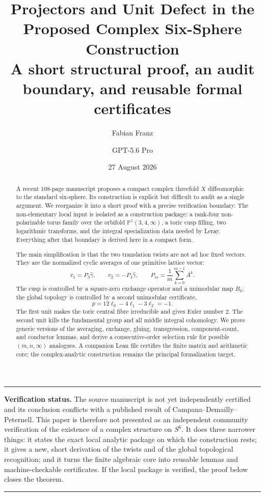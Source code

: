 \documentclass[11pt,reqno]{amsart}
\title[Projectors and unit defect for the proposed complex $S^6$]{Projectors and Unit Defect in the Proposed Complex Six-Sphere Construction\\[4pt]
\large A short structural proof, an audit boundary, and reusable formal certificates}
\author{Fabian Franz}
\author{GPT-5.6 Pro}
\date{27 August 2026}
\numberwithin{equation}{section}
\newcommand{\Pone}{\mathbb P^1}
\newcommand{\wideg}{\widehat\gamma}
\theoremstyle{definition}
\newenvironment{statusnote}{%
  \begin{center}\begin{minipage}{0.94\textwidth}\small\hrule\vspace{0.7em}%
}{%
  \vspace{0.7em}\hrule\end{minipage}\end{center}%
}
\begin{document}
\begin{abstract}
A recent 108-page manuscript proposes a compact complex threefold $X$ diffeomorphic to the standard six-sphere. Its construction is explicit but difficult to audit as a single argument. We reorganize it into a short proof with a precise verification boundary. The non-elementary local input is isolated as a construction package: a rank-four non-polarizable torus family over the orbifold $\Pone(3,4,\infty)$, a toric cusp filling, two logarithmic transforms, and the integral specialization data needed by Leray. Everything after that boundary is derived here in a compact form.

The main simplification is that the two translation twists are not ad hoc fixed vectors. They are the normalized cyclic averages of one primitive lattice vector:
\[
 v_1=P_3\wideg,\qquad v_2=-P_4\wideg,
 \qquad
 P_m=\frac1m\sum_{k=0}^{m-1}A^k.
\]
The cusp is controlled by a square-zero exchange operator and a unimodular map $B_0$; the global topology is controlled by a second unimodular certificate,
\[
 p=12\ell_0-4\ell_1-3\ell_2=-1.
\]
The first unit makes the toric central fibre irreducible and gives Euler number $2$. The second unit kills the fundamental group and all middle integral cohomology. We prove generic versions of the averaging, exchange, gluing, transgression, component-count, and conductor lemmas, and derive a consecutive-order selection rule for possible $(m,n,\infty)$ analogues. A companion Lean file certifies the finite matrix and arithmetic core; the complex-analytic construction remains the principal formalization target.
\end{abstract}

\maketitle
\tableofcontents

\begin{statusnote}
\textbf{Verification status.}
The source manuscript is not yet independently certified and its conclusion conflicts with a published result of Campana--Demailly--Peternell. This paper is therefore not presented as an independent community verification of the existence of a complex structure on $S^6$. It does three narrower things: it states the exact local analytic package on which the construction rests; it gives a new, short derivation of the twists and of the global topological recognition; and it turns the finite algebraic core into reusable lemmas and machine-checkable certificates. If the local package is verified, the proof below closes the theorem.
\end{statusnote}
\end{document}
